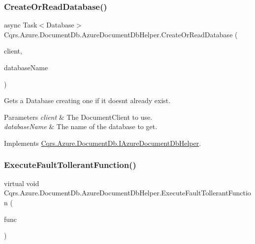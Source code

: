 \subsubsection{\texorpdfstring{Create\+Or\+Read\+Database()}{CreateOrReadDatabase()}}
{\footnotesize\ttfamily async Task$<$Database$>$ Cqrs.\+Azure.\+Document\+Db.\+Azure\+Document\+Db\+Helper.\+Create\+Or\+Read\+Database (\begin{DoxyParamCaption}\item[{Document\+Client}]{client,  }\item[{string}]{database\+Name }\end{DoxyParamCaption})}



Gets a Database creating one if it doesn\textquotesingle{}t already exist. 


\begin{DoxyParams}{Parameters}
{\em client} & The Document\+Client to use.\\
\hline
{\em database\+Name} & The name of the database to get.\\
\hline
\end{DoxyParams}


Implements \hyperlink{interfaceCqrs_1_1Azure_1_1DocumentDb_1_1IAzureDocumentDbHelper_a07fd454bc3cb598d89d058e0ad0d9bb9_a07fd454bc3cb598d89d058e0ad0d9bb9}{Cqrs.\+Azure.\+Document\+Db.\+I\+Azure\+Document\+Db\+Helper}.

\mbox{\label{classCqrs_1_1Azure_1_1DocumentDb_1_1AzureDocumentDbHelper_a334337444ff416c9f4ce48ec61e60a83_a334337444ff416c9f4ce48ec61e60a83}} 
\subsubsection{\texorpdfstring{Execute\+Fault\+Tollerant\+Function()}{ExecuteFaultTollerantFunction()}}
{\footnotesize\ttfamily virtual void Cqrs.\+Azure.\+Document\+Db.\+Azure\+Document\+Db\+Helper.\+Execute\+Fault\+Tollerant\+Function (\begin{DoxyParamCaption}\item[{Action}]{func }\end{DoxyParamCaption})\hspace{0.3cm}{\ttfamily [virtual]}}



